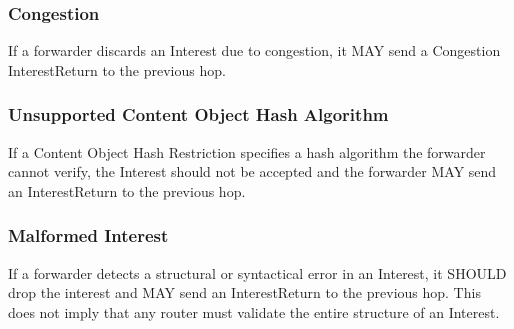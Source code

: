 \documentclass[12pt]{article}
\begin{document}
\subsubsection{Congestion}
If a forwarder discards an Interest due to congestion, it MAY send a
Congestion InterestReturn to the previous hop.

\subsubsection{Unsupported Content Object Hash Algorithm}
If a Content Object Hash Restriction specifies a hash algorithm the
forwarder cannot verify, the Interest should not be accepted and the
forwarder MAY send an InterestReturn to the previous hop.

\subsubsection{Malformed Interest}
If a forwarder detects a structural or syntactical error in an
Interest, it SHOULD drop the interest and MAY send an InterestReturn
to the previous hop.  This does not imply that any router must
validate the entire structure of an Interest.




\end{document}
